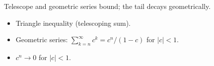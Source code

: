 \begin{remark*}
Telescope and geometric series bound; the tail decays geometrically.
\end{remark*}

\begin{remark*}[Dependencies]
\begin{itemize}
  \item Triangle inequality (telescoping sum).
  \item Geometric series: $\sum_{k=n}^\infty c^k = c^n/(1-c)$ for $|c| < 1$.
  \item $c^n \to 0$ for $|c| < 1$.
\end{itemize}
\end{remark*}
